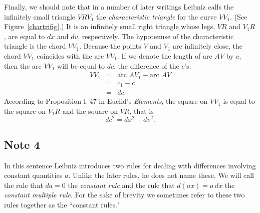 \documentclass[polutonikogreek,english,twoside,openright]{article}
\begin{document}
Finally, we should note that in a number of later writings Leibniz
calls the infinitely small triangle $VRV_1$ the {\em characteristic
  triangle}\label{chartri} for the curve $VV_1$.  (See
Figure~\ref{chartrifig}.) It is an infinitely small right triangle
whose legs, $VR$ and $V_1R$, are equal to $dx$ and $dv$, respectively.
The hypotenuse of the characteristic triangle is the chord $VV_1$.
Because the points $V$ and $V_1$ are infinitely close, the chord
$VV_1$ coincides with the arc $VV_1$.  If we denote the length of arc
$AV$ by $c$, then the arc $VV_1$ will be equal to $dc$, the difference
of the $c$'s:
\begin{eqnarray*}
VV_1 & = &\mbox{arc }AV_1 - \mbox{arc }AV\\
& = & c_1 - c\\
& = & dc.
\end{eqnarray*}
According to Proposition I~47 in Euclid's {\em Elements}, the square
on $VV_1$ is equal to the square on $V_1R$ and the square on $VR$,
that is
$$dc^2 = dx^2 + dv^2.$$



\subsection*{Note 4}
\label{cnm4}

In this sentence Leibniz introduces two rules for dealing with
differences involving constant quantities $a$.  Unlike the later
rules, he does not name these.  We will call the rule that $da =0$ the
{\em constant rule} and the rule that $d(ax) = a\,dx$ the {\em
  constant multiple rule}.  For the sake of brevity we sometimes refer
to these two rules together as the ``constant rules."
\end{document}
